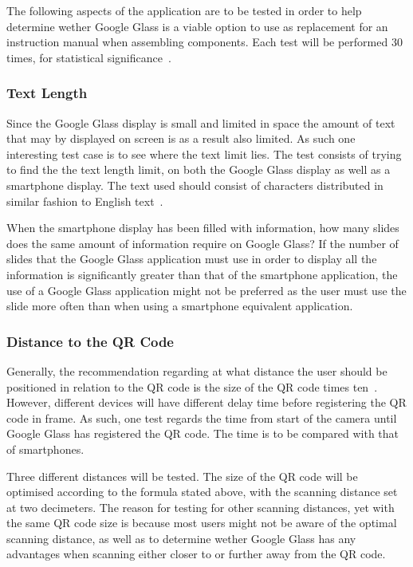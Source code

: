 The following aspects of the application are to be tested in order to help determine wether Google Glass is a viable option to use as replacement for an instruction manual when assembling components. Each test will be performed 30 times, for statistical significance~\cite{30sampleSize}.

\subsubsection{Text Length}
Since the Google Glass display is small and limited in space the amount of text that may by displayed on screen is as a result also limited. As such one interesting test case is to see where the text limit lies. The test consists of trying to find the the text length limit, on both the Google Glass display as well as a smartphone display. The text used should consist of characters distributed in similar fashion to English text~\cite{englishTextStat}.

When the smartphone display has been filled with information, how many slides does the same amount of information require on Google Glass? If the number of slides that the Google Glass application must use in order to display all the information is significantly greater than that of the smartphone application, the use of a Google Glass application might not be preferred as the user must use the slide more often than when using a smartphone equivalent application.



\subsubsection{Distance to the QR Code}
Generally, the recommendation regarding at what distance the user should be positioned in relation to the QR code is the size of the QR code times ten~\cite{qrCodeSizeComplexity}. However, different devices will have different delay time before registering the QR code in frame. As such, one test regards the time from start of the camera until Google Glass has registered the QR code. The time is to be compared with that of smartphones.

Three different distances will be tested. The size of the QR code will be optimised according to the formula stated above, with the scanning distance set at two decimeters. The reason for testing for other scanning distances, yet with the same QR code size is because most users might not be aware of the optimal scanning distance, as well as to determine wether Google Glass has any advantages when scanning either closer to or further away from the QR code.

